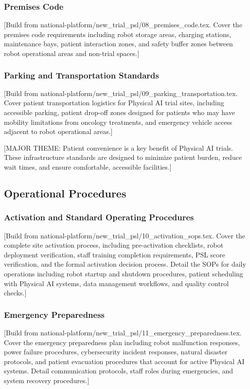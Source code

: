 \subsubsection{Premises Code}
[Build from national-platform/new\_trial\_psl/08\_premises\_code.tex. Cover
the premises code requirements including robot storage areas, charging
stations, maintenance bays, patient interaction zones, and safety buffer
zones between robot operational areas and non-trial spaces.]

\subsubsection{Parking and Transportation Standards}
[Build from national-platform/new\_trial\_psl/09\_parking\_transportation.tex.
Cover patient transportation logistics for Physical AI trial sites,
including accessible parking, patient drop-off zones designed for patients
who may have mobility limitations from oncology treatments, and emergency
vehicle access adjacent to robot operational areas.]

[MAJOR THEME: Patient convenience is a key benefit of Physical AI trials.
These infrastructure standards are designed to minimize patient burden,
reduce wait times, and ensure comfortable, accessible facilities.]

\subsection{Operational Procedures}
\label{subsec:site-operations}

\subsubsection{Activation and Standard Operating Procedures}
[Build from national-platform/new\_trial\_psl/10\_activation\_sops.tex.
Cover the complete site activation process, including pre-activation
checklists, robot deployment verification, staff training completion
requirements, PSL score verification, and the formal activation decision
process. Detail the SOPs for daily operations including robot startup
and shutdown procedures, patient scheduling with Physical AI systems,
data management workflows, and quality control checks.]

\subsubsection{Emergency Preparedness}
[Build from national-platform/new\_trial\_psl/11\_emergency\_preparedness.tex.
Cover the emergency preparedness plan including robot malfunction responses,
power failure procedures, cybersecurity incident responses, natural disaster
protocols, and patient evacuation procedures that account for active Physical
AI systems. Detail communication protocols, staff roles during emergencies,
and system recovery procedures.]

